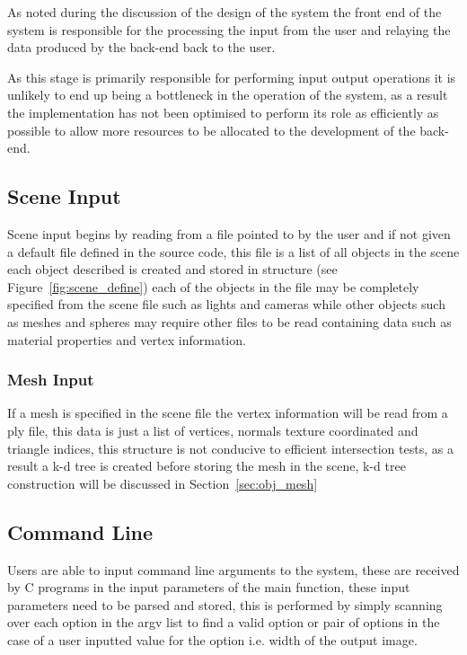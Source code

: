 As noted during the discussion of the design of the system the front end of the system is responsible for the processing
the input from the user and relaying the data produced by the back-end back to the user.

As this stage is primarily responsible
for performing input output operations it is unlikely to end up being a bottleneck in the operation of the system, as a
result the implementation has not been optimised to perform its role as efficiently as possible to allow more resources
to be allocated to the development of the back-end.

\subsection{Scene Input}
Scene input begins by reading from a file pointed to by the user and if not given a default file defined in the source
code, this file is a list of all objects in the scene each
object described is created and stored in structure (see Figure~\ref{fig:scene_define}) each of the objects in the
file may be completely specified from the scene file such as lights and cameras while other objects such as meshes
and spheres may require other files to be read containing data such as material properties and vertex information.

\subsubsection{Mesh Input}
If a mesh is specified in the scene file the vertex information will be read from a ply file, this data is just a list
of vertices, normals texture coordinated and triangle indices, this structure is not conducive to efficient intersection
tests, as a result a k-d tree is created before storing the mesh in the scene, k-d tree construction will be discussed in
Section~\ref{sec:obj_mesh}

\subsection{Command Line}
Users are able to input command line arguments to the system, these are received by C programs in the input parameters of
the main function, these input parameters need to be parsed and stored, this is performed by simply scanning over each
option in the argv list to find a valid option or pair of options in the case of a user inputted value for the option
i.e. width of the output image.

